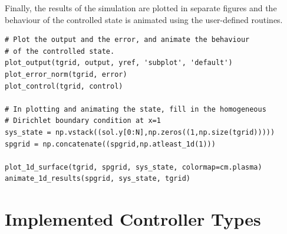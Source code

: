 \documentclass[11pt, a4paper]{amsart}
\theoremstyle{definition}
\numberwithin{equation}{section}
\begin{document}
Finally, the results of the simulation are plotted in separate figures and the behaviour of the controlled state is animated using the user-defined routines.

\begin{lstlisting}
# Plot the output and the error, and animate the behaviour 
# of the controlled state.
plot_output(tgrid, output, yref, 'subplot', 'default')
plot_error_norm(tgrid, error)
plot_control(tgrid, control)

# In plotting and animating the state, fill in the homogeneous
# Dirichlet boundary condition at x=1
sys_state = np.vstack((sol.y[0:N],np.zeros((1,np.size(tgrid)))))
spgrid = np.concatenate((spgrid,np.atleast_1d(1)))

plot_1d_surface(tgrid, spgrid, sys_state, colormap=cm.plasma)
animate_1d_results(spgrid, sys_state, tgrid)
\end{lstlisting}


\section{Implemented Controller Types}
\label{sec:ControllerTypes}
\end{document}
